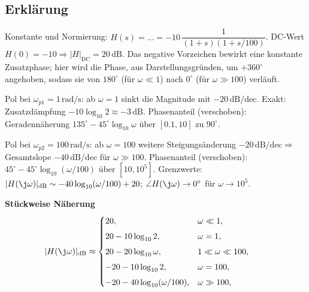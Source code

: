 \begin{center}
\end{center}
\newpage
\subsection{Erklärung}
\vspace{5mm}
\begin{description}[leftmargin=1.2em,labelsep=.6em,font=\bfseries]
\item[Schritt 1] Konstante und Normierung: 
\(H(s)=...=-10\,\dfrac{1}{(1+s)(1+s/100)}\).
DC-Wert \(H(0)=-10\Rightarrow |H|_{\mathrm{DC}}=20\,\mathrm{dB}\). Das negative Vorzeichen bewirkt eine konstante Zusatzphase; hier wird die Phase, aus Darstellungsgründen, um \(+360^\circ\) angehoben, sodass sie von \(180^\circ\) (für \(\omega\ll1\)) nach \(0^\circ\) (für \(\omega\gg100\)) verläuft.
\item[Schritt 2] Pol bei \(\omega_{p1}=1\,\mathrm{rad/s}\): ab \(\omega=1\) sinkt die Magnitude mit \(-20\,\mathrm{dB/dec}\). Exakt: Zusatzdämpfung \(-10\log_{10}2\approx-3\,\mathrm{dB}\). Phasenanteil (verschoben): Geradennäherung \(135^\circ-45^\circ\log_{10}\omega\) über \([0.1,10]\) zu $90^\circ$.
\item[Schritt 3] Pol bei \(\omega_{p2}=100\,\mathrm{rad/s}\): ab \(\omega=100\) weitere Steigungsänderung \(-20\,\mathrm{dB/dec}\)\(\Rightarrow\) Gesamtslope \(-40\,\mathrm{dB/dec}\) für \(\omega\gg100\). Phasenanteil (verschoben): \(45^\circ-45^\circ\log_{10}(\omega/100)\) über \([10,10^5]\). Grenzwerte: \(|H(\j\omega)|_{\mathrm{dB}}\sim -40\log_{10}(\omega/100)+20\); \(\angle H(\j\omega)\to 0^\circ\) für \(\omega\to10^5\).
\end{description}

\vspace{0.5cm}
\medskip
\noindent\textbf{Stückweise Näherung}
\[
|H(\j\omega)|_{\mathrm{dB}}\approx
\begin{cases}
20,& \omega\ll1,\\[4pt]
20-10\log_{10}2,& \omega=1,\\[4pt]
20-20\log_{10}\omega,& 1\ll\omega\ll100,\\[4pt]
-20-10\log_{10}2,& \omega=100,\\[4pt]
-20-40\log_{10}(\omega/100),& \omega\gg100,
\end{cases}
\qquad
\]
\newpage